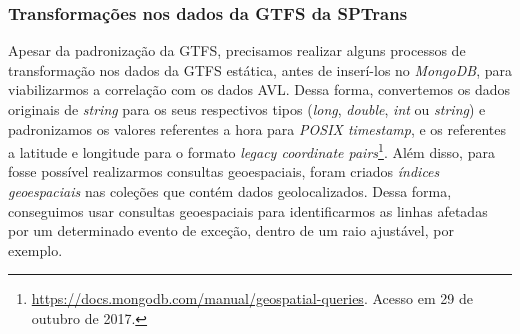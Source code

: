 \documentclass[
	12pt,				%
	oneside,			%
	a4paper,			%
	english,			%
	brazil				%
	]{abntex2ppgsi}
\begin{document}
{{%


\clearpage

\subsubsection{Transformações nos dados da GTFS da SPTrans}

Apesar da padronização da GTFS, precisamos realizar alguns processos de transformação nos dados da GTFS estática, antes de inserí-los no \textit{MongoDB}, para viabilizarmos a correlação com os dados AVL.  Dessa forma, convertemos os dados originais de \textit{string} para os seus respectivos tipos (\textit{long}, \textit{double}, \textit{int} ou \textit{string}) e padronizamos os valores referentes a hora para \textit{POSIX timestamp}, e os referentes a latitude e longitude para o formato \textit{legacy coordinate pairs}\footnote{\label{geoMongo}\url{https://docs.mongodb.com/manual/geospatial-queries}. Acesso em 29 de outubro de 2017.}. Além disso,  para fosse possível realizarmos consultas geoespaciais, foram criados \textit{índices geoespaciais} nas coleções que contém dados geolocalizados. Dessa forma, conseguimos usar consultas geoespaciais para identificarmos as linhas afetadas por um determinado evento de exceção, dentro de um raio ajustável, por exemplo.

}}
\end{document}
